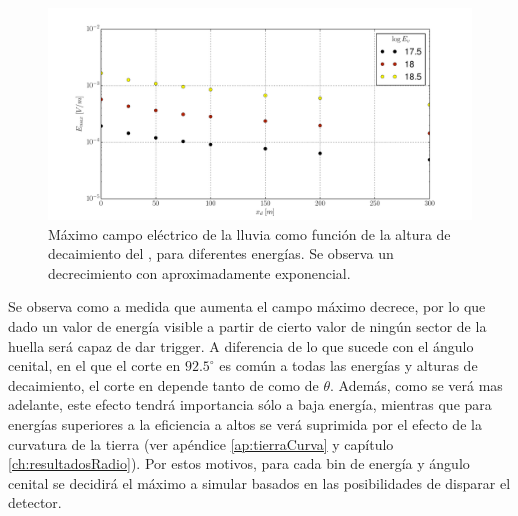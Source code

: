 	\begin{figure}[ht!]
		\centering
		\includegraphics[width=\textwidth]{./fig/simulacionRadio/maxDep/eMaxXd.pdf}
		\caption{\label{fig:xd_dependence2}
		M\'aximo campo el\'ectrico de la lluvia como funci\'on de la altura de decaimiento del \tauon{}, para diferentes energ\'ias.
		Se observa un decrecimiento con \xd{} aproximadamente exponencial.
		}
	\end{figure}
	
	Se observa como a medida que \xd{} aumenta el campo m\'aximo decrece, por lo que dado un valor de energ\'ia visible a partir de cierto valor de \xd{} ning\'un sector de la huella ser\'a capaz de dar trigger.
	A diferencia de lo que sucede con el \'angulo cenital, en el que el corte en $92.5^\circ$ es com\'un a todas las energ\'ias y alturas de decaimiento, el corte en \xd{} depende tanto de \ev{} como de $\theta$.
	Adem\'as, como se ver\'a mas adelante, este efecto tendr\'a importancia s\'olo a baja energ\'ia, mientras que para energ\'ias superiores a  la eficiencia a altos \xd{} se ver\'a suprimida por el efecto de la curvatura de la tierra (ver ap\'endice \ref{ap:tierraCurva} y cap\'itulo \ref{ch:resultadosRadio}).
	Por estos motivos, para cada bin de energ\'ia y \'angulo cenital se decidir\'a el m\'aximo \xd{} a simular basados en las posibilidades de disparar el detector.
	
